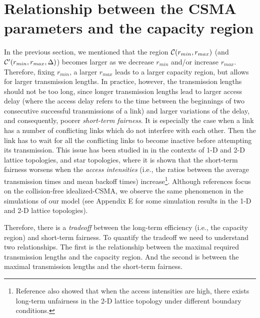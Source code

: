 \documentclass{IEEEtran}
\begin{document}
\section{\label{sec:capacity-region}Relationship between the CSMA parameters
and the capacity region}

In the previous section, we mentioned that the region ${\cal C}(r_{min},r_{max})$
(and ${\cal C}'(r_{min},r_{max},\Delta)$) becomes larger as we decrease
$r_{min}$ and/or increase $r_{max}$. Therefore, fixing $r_{min}$,
a larger $r_{max}$ leads to a larger capacity region, but allows
for larger transmission lengths. In practice, however, the transmission
lengths should not be too long, since longer transmission lengths\textbf{
}lead to larger access delay (where the access delay refers to the
time between the beginnings of two consecutive successful transmissions
of a link) and larger variations of the delay, and consequently, poorer
\emph{short-term fairness}. It is especially the case when a link
has a number of conflicting links which do not interfere with each
other. Then the link has to wait for all the conflicting links to
become inactive before attempting its transmission. This issue has
been studied in \cite{Thiran}\cite{conv_MS}\cite{BoE} in the contexts
of 1-D and 2-D lattice topologies, and star topologies, where it is
shown that the short-term fairness worsens when the \emph{access intensities}
(i.e., the ratios between the average transmission times and mean
backoff times) increase\footnote{Reference \cite{Thiran} also showed that when the access intensities
are high, there exists long-term unfairness in the 2-D lattice topology
under different boundary conditions.}. Although references \cite{Thiran}\cite{conv_MS}\cite{BoE} focus
on the collision-free idealized-CSMA, we observe the same phenomenon
in the simulations of our model (see Appendix E for some simulation
results in the 1-D and 2-D lattice topologies). 

Therefore, there is a \emph{tradeoff} between the long-term efficiency
(i.e., the capacity region) and short-term fairness. To quantify the
tradeoff we need to understand two relationships. The first is the
relationship between the maximal required transmission lengths and
the capacity region. And the second is between the maximal transmission
lengths and the short-term fairness. 
\end{document}
